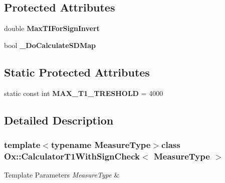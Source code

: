 \subsection*{Protected Attributes}
\begin{DoxyCompactItemize}
\item 
\hypertarget{class_ox_1_1_calculator_t1_with_sign_check_afce5bda5ac3751598e6c650943f3b818}{double {\bfseries Max\-T\-I\-For\-Sign\-Invert}}\label{class_ox_1_1_calculator_t1_with_sign_check_afce5bda5ac3751598e6c650943f3b818}

\item 
\hypertarget{class_ox_1_1_calculator_t1_with_sign_check_a876d4995b15f612f15bbdd253c379a2b}{bool {\bfseries \-\_\-\-Do\-Calculate\-S\-D\-Map}}\label{class_ox_1_1_calculator_t1_with_sign_check_a876d4995b15f612f15bbdd253c379a2b}

\end{DoxyCompactItemize}
\subsection*{Static Protected Attributes}
\begin{DoxyCompactItemize}
\item 
\hypertarget{class_ox_1_1_calculator_t1_with_sign_check_a20fbb003a018e0f62707ac306b0c6ac3}{static const int {\bfseries M\-A\-X\-\_\-\-T1\-\_\-\-T\-R\-E\-S\-H\-O\-L\-D} = 4000}\label{class_ox_1_1_calculator_t1_with_sign_check_a20fbb003a018e0f62707ac306b0c6ac3}

\end{DoxyCompactItemize}


\subsection{Detailed Description}
\subsubsection*{template$<$typename Measure\-Type$>$class Ox\-::\-Calculator\-T1\-With\-Sign\-Check$<$ Measure\-Type $>$}


\begin{DoxyTemplParams}{Template Parameters}
{\em Measure\-Type} & \\
\hline
\end{DoxyTemplParams}


